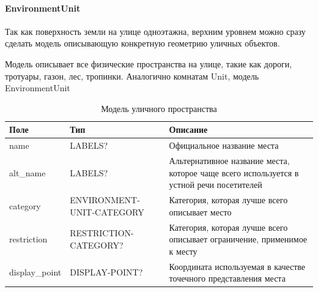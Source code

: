       \paragraph{EnvironmentUnit}
        Так как поверхность земли на улице одноэтажна, верхним уровнем можно сразу сделать модель описывающую конкретную геометрию уличных объектов.

        Модель описывает все физические пространства на улице, такие как дороги, тротуары, газон, лес, тропинки. Аналогично комнатам Unit, модель EnvironmentUnit
        \begin{center}
          \begin{xltabular}{\linewidth}{|l|p{4cm}|X|}
            \caption{Модель уличного пространства}\\\hline
            Поле           & Тип                       & Описание                                                                                 \\ \hline
            name           & LABELS?                   & Официальное название места                                                               \\ \hline
            alt\_name      & LABELS?                   & Альтернативное название места, которое чаще всего используется в устной речи посетителей \\ \hline
            category       & ENVIRONMENT-UNIT-CATEGORY & Категория, которая лучше всего описывает место                                           \\ \hline
            restriction    & RESTRICTION-CATEGORY?     & Категория, которая лучше всего описывает ограничение, применимое к месту                 \\ \hline
            display\_point & DISPLAY-POINT?            & Координата используемая в качестве точечного представления места                         \\ \hline
          \end{xltabular}
        \end{center}

